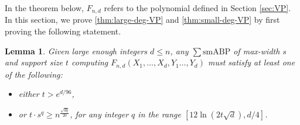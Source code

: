 \documentclass[10pt,a4paper]{article}
\newtheorem{lem}[theorem]{Lemma}
\theoremstyle{definition}%
\theoremstyle{plain}
\newcommand{\sbp}{\sum\mathrm{smABP}}
\begin{document}
In the theorem below, $F_{n,d}$ refers to the polynomial defined in Section \ref{sec:VP}. 
In this section, we prove \autoref{thm:large-deg-VP} and \autoref{thm:small-deg-VP} by first proving the following statement. 

\begin{lem}\label{lem:VP}
    Given large enough integers $d\leq n$, any $\sbp$ of max-width $s$ and support size $t$ computing $F_{n,d}(X_1,\ldots,X_d,Y_1\ldots,Y_d)$ must satisfy at least one of the following:
    \begin{itemize}
        \item either $t>e^{d/96}$,
        \item or $t\cdot s^q \geq n^{\frac{\sqrt{dq}}{20}}$, for any integer $q$ in the range $ [12\ln(2t\sqrt{d}), d/4]$.
    \end{itemize}  
\end{lem}
\end{document}
